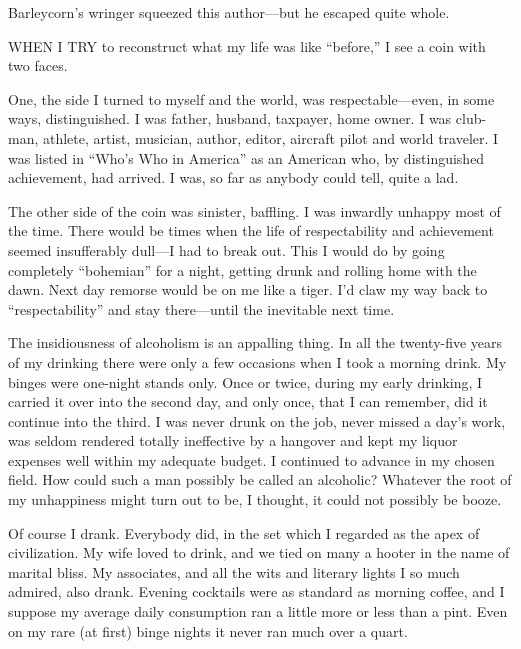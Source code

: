 

\bbChapterPreamble




\begin{biblechapter}
    Barleycorn’s wringer squeezed this author—but 
    he escaped quite whole.
\end{biblechapter}


\begin{biblechapter}
    WHEN I TRY to reconstruct what my life was like “before,” 
    I see a coin with two faces.

\verse One, the side I turned to myself and the world, 
    was respectable—even, in some ways, 
    distinguished.
\verse I was father, husband, taxpayer, home owner.
\verse I was club-man, athlete, artist, musician, 
    author, editor, aircraft pilot and world traveler.
\verse I was listed in “Who’s Who in America” as an American who, 
    by distinguished achievement, had arrived.
\verse I was, so far as anybody could tell, quite a lad.

\verse The other side of the coin was sinister, baffling. I was inwardly unhappy most of the time. There would be times when the life of respectability and achievement seemed insufferably dull—I had to break out. This I would do by going completely “bohemian” for a night, getting drunk and rolling home with the dawn. Next day remorse would be on me like a tiger. I’d claw my way back to “respectability” and stay there—until the inevitable next time.

The insidiousness of alcoholism is an appalling thing. In all the twenty-five years of my drinking there were only a few occasions when I took a morning drink. My binges were one-night stands only. Once or twice, during my early drinking, I carried it over into the second day, and only once, that I can remember, did it continue into the third. I was never drunk on the job, never missed a day’s work, was seldom rendered totally ineffective by a hangover and kept my liquor expenses well within my adequate budget. I continued to advance in my chosen field. How could such a man possibly be called an alcoholic? Whatever the root of my unhappiness might turn out to be, I thought, it could not possibly be booze.

Of course I drank. Everybody did, in the set which I regarded as the apex of civilization. My wife loved to drink, and we tied on many a hooter in the name of marital bliss. My associates, and all the wits and literary lights I so much admired, also drank. Evening cocktails were as standard as morning coffee, and I suppose my average daily consumption ran a little more or less than a pint. Even on my rare (at first) binge nights it never ran much over a quart.


\end{biblechapter}
